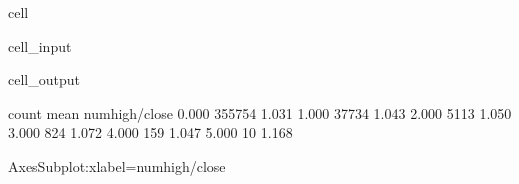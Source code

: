 \documentclass[letterpaper,10pt,english]{jupyterBook}
\begin{document}
\begin{sphinxuseclass}{cell}\begin{sphinxVerbatimInput}

\begin{sphinxuseclass}{cell_input}
\begin{sphinxVerbatim}[commandchars=\\\{\}]
  
\PYG{p}{[}\PYG{p}{]}\PYG{p}{[}\PYG{p}{]}
\PYG{p}{[}\PYG{p}{]}  
\end{sphinxVerbatim}

\end{sphinxuseclass}\end{sphinxVerbatimInput}
\begin{sphinxVerbatimOutput}

\begin{sphinxuseclass}{cell_output}
\begin{sphinxVerbatim}[commandchars=\\\{\}]
                 count  mean
num\PYGZus{}high/close              
0.000           355754 1.031
1.000            37734 1.043
2.000             5113 1.050
3.000              824 1.072
4.000              159 1.047
5.000               10 1.168
\end{sphinxVerbatim}

\begin{sphinxVerbatim}[commandchars=\\\{\}]
\PYGZlt{}AxesSubplot:xlabel=\PYGZsq{}num\PYGZus{}high/close\PYGZsq{}\PYGZgt{}
\end{sphinxVerbatim}

\noindent{}

\end{sphinxuseclass}\end{sphinxVerbatimOutput}

\end{sphinxuseclass}
\end{document}
